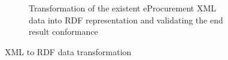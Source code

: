 \begin{figure}
\begin{subfigure}[b]{.48\textwidth}
			\caption{Transformation of the existent eProcurement XML data into RDF representation and validating the end result conformance}
			\label{fig:sub2}
		\end{subfigure}
		\caption{XML to RDF data transformation}
		\label{fig:test}
	\end{figure}

	
	